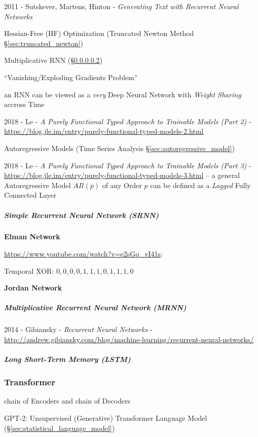 2011 - Sutskever, Martens, Hinton -
  \emph{Generating Text with Recurrent Neural Networks}

Hessian-Free (HF) Optimization (Truncated Newton Method
\S\ref{sec:truncated_newton})

Multiplicative RNN (\S\ref{sec:mrnn})

``Vanishing/Exploding Gradients Problem''

an RNN can be viewed as a \emph{very} Deep Neural Network with \emph{Weight
  Sharing} accross Time

\asterism

2018 - Le -
\emph{A Purely Functional Typed Approach to Trainable Models (Part 2)} -
\url{https://blog.jle.im/entry/purely-functional-typed-models-2.html}

\fist Autoregressive Models (Time Series Analysis
\S\ref{sec:autoregressive_model})

2018 - Le -
\emph{A Purely Functional Typed Approach to Trainable Models (Part 3)} -
\url{https://blog.jle.im/entry/purely-functional-typed-models-3.html}
-- a general Autoregressive Model $AR(p)$ of any Order $p$ can be defined as a
\emph{Lagged} Fully Connected Layer



\subparagraph{Simple Recurrent Neural Network (SRNN)}\label{sec:srnn}\hfill

\textbf{Elman Network}

\url{https://www.youtube.com/watch?v=e2sGq_vI41s}:

Temporal XOR:
$0, 0, 0, 0, 1, 1, 1, 0, 1, 1, 1, 0$


\textbf{Jordan Network}



\subparagraph{Multiplicative Recurrent Neural Network (MRNN)}\label{sec:mrnn}
\hfill

2014 - Gibiansky - \emph{Recurrent Neural Networks} -
\url{http://andrew.gibiansky.com/blog/machine-learning/recurrent-neural-networks/}



\subparagraph{Long Short-Term Memory (LSTM)}\label{sec:lstm}\hfill



\subsubsection{Transformer}\label{sec:transformer}

chain of Encoders and chain of Decoders

GPT-2: Unsupervised (Generative) Transformer Language Model
(\S\ref{sec:statistical_language_model})




